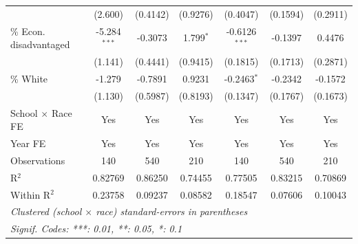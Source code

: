 \documentclass[hidelinks,twoside]{article}
\begin{document}
\begin{table}
\begin{tabular}{lcccccc}
                                            & (2.600)        & (0.4142)       & (0.9276)      & (0.4047)        & (0.1594)       & (0.2911)\\   
   \% Econ. disadvantaged                         & -5.284$^{***}$ & -0.3073        & 1.799$^{*}$   & -0.6126$^{***}$ & -0.1397        & 0.4476\\   
                                            & (1.141)        & (0.4441)       & (0.9415)      & (0.1815)        & (0.1713)       & (0.2871)\\   
   \% White                           & -1.279         & -0.7891        & 0.9231        & -0.2463$^{*}$   & -0.2342        & -0.1572\\   
                                            & (1.130)        & (0.5987)       & (0.8193)      & (0.1347)        & (0.1767)       & (0.1673)\\   
   \midrule
   School $\times$ Race FE                                   & Yes            & Yes            & Yes           & Yes             & Yes            & Yes\\  
   Year FE                                     & Yes            & Yes            & Yes           & Yes             & Yes            & Yes\\  
   Observations                             & 140            & 540            & 210           & 140             & 540            & 210\\  
   R$^2$                                    & 0.82769        & 0.86250        & 0.74455       & 0.77505         & 0.83215        & 0.70869\\  
   Within R$^2$                             & 0.23758        & 0.09237        & 0.08582       & 0.18547         & 0.07606        & 0.10043\\  
   \midrule \midrule
   \multicolumn{7}{l}{\emph{Clustered (school $\times$ race) standard-errors in parentheses}}\\
   \multicolumn{7}{l}{\emph{Signif. Codes: ***: 0.01, **: 0.05, *: 0.1}}\\
\end{tabular}
\label{tab:eventstudy_combined}
\end{table}
\end{document}
